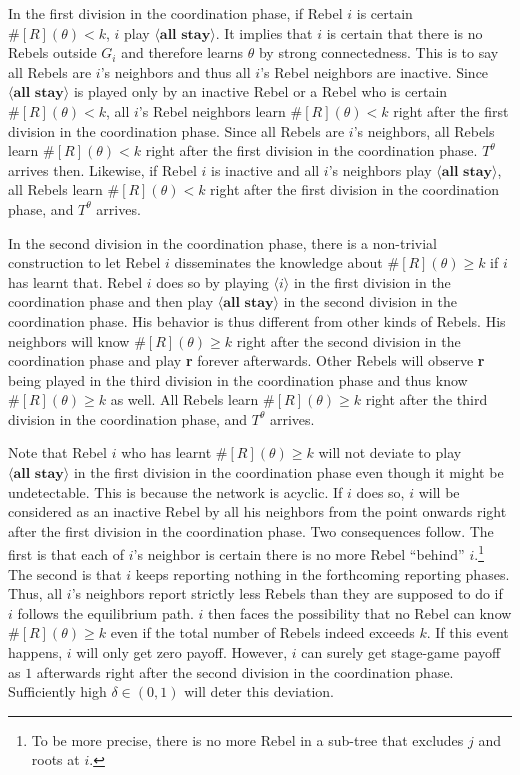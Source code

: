 \documentclass[12pt,letter]{article}
\theoremstyle{definition}
\theoremstyle{remark}
\theoremstyle{claim}
\begin{document}
In the first division in the coordination phase, if Rebel $i$ is certain $\#[R](\theta)<k$, $i$ play $\langle \textbf{all stay} \rangle$. It implies that $i$ is certain that there is no Rebels outside $G_i$ and therefore learns $\theta$ by strong connectedness. This is to say all Rebels are $i$'s neighbors and thus all $i$'s Rebel neighbors are inactive. Since $\langle \textbf{all stay} \rangle$ is played only by an inactive Rebel or a Rebel who is certain $\#[R](\theta)<k$, all $i$'s Rebel neighbors learn $\#[R](\theta)<k$ right after the first division in the coordination phase. Since all Rebels are $i$'s neighbors, all Rebels learn $\#[R](\theta)<k$ right after the first division in the coordination phase. $T^{\theta}$ arrives then. Likewise, if Rebel $i$ is inactive and all $i$'s neighbors play $\langle \textbf{all stay} \rangle$, all Rebels learn $\#[R](\theta)<k$ right after the first division in the coordination phase, and $T^{\theta}$ arrives.    

In the second division in the coordination phase, there is a non-trivial construction to let Rebel $i$ disseminates the knowledge about $\#[R](\theta)\geq k$ if $i$ has learnt that. Rebel $i$ does so by playing $\langle i \rangle$ in the first division in the coordination phase and then play $\langle \textbf{all stay} \rangle$ in the second division in the coordination phase. His behavior is thus different from other kinds of Rebels. His neighbors will know $\#[R](\theta)\geq k$ right after the second division in the coordination phase and play \textbf{r} forever afterwards. Other Rebels will observe \textbf{r} being played in the third division in the coordination phase and thus know $\#[R](\theta)\geq k$ as well. All Rebels learn $\#[R](\theta)\geq k$ right after the third division in the coordination phase, and $T^{\theta}$ arrives.

Note that Rebel $i$ who has learnt $\#[R](\theta)\geq k$ will not deviate to play $\langle \textbf{all stay} \rangle$ in the first division in the coordination phase even though it might be undetectable. This is because the network is acyclic. If $i$ does so, $i$ will be considered as an inactive Rebel by all his neighbors from the point onwards right after the first division in the coordination phase. Two consequences follow. The first is that each of $i$'s neighbor is certain there is no more Rebel ``behind'' $i$.\footnote{To be more precise, there is no more Rebel in a sub-tree that excludes $j$ and roots at $i$.} 
The second is that $i$ keeps reporting nothing in the forthcoming reporting phases. Thus, all $i$'s neighbors report strictly less Rebels than they are supposed to do if $i$ follows the equilibrium path. $i$ then faces the possibility that no Rebel can know $\#[R](\theta)\geq k$ even if the total number of Rebels indeed exceeds $k$. If this event happens, $i$ will only get zero payoff. However, $i$ can surely get stage-game payoff as $1$ afterwards right after the second division in the coordination phase. Sufficiently high $\delta\in(0,1)$ will deter this deviation. 
\end{document}

